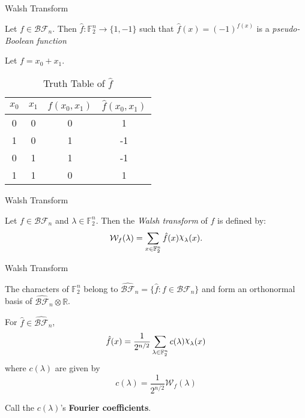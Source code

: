 \documentclass{beamer}
\def\gftwo{\mathbb{F}_2}
\def\BF{\mathcal{BF}}
\def\Chi{\raisebox{2pt}{$\chi$}}
\begin{document}
\begin{frame}{Walsh Transform}
  \begin{definition}\label{def:pBF}
    Let $f\in\BF_n$. Then $\hat{f}:\gftwo^n\rightarrow\{1,-1\}$ such that
    $\hat{f}(x)=(-1)^{f(x)}$ is a \textit{pseudo-Boolean function}
  \end{definition}
  \begin{example}
    Let $f=x_0+x_1$.
    \begin{table}
    \label{tab:truth-table}
    	\centering
      \begin{tabular}{|c|c||c|c|}
        \hline
        $x_0$&$x_1$&$f(x_0,x_1)$&$\hat{f}(x_0,x_1)$\\
        \hline
        0&0&0&1\\
        1&0&1&-1\\
        0&1&1&-1\\
        1&1&0&1\\
      	\hline
    	\end{tabular}
      \caption{Truth Table of $\hat{f}$}
    \end{table}
  \end{example}
\end{frame}

\begin{frame}{Walsh Transform}
  \begin{definition}\label{def:walsh}
    Let $f\in\BF_n$ and $\lambda\in\gftwo^n$. Then the {\em Walsh transform}
    of $f$ is defined by:
    \begin{equation}\label{eqn:walsh}
      \mathcal{W}_f(\lambda)=\sum_{x\in\gftwo^n}\hat{f}(x)\Chi_\lambda(x).
    \end{equation}
  \end{definition}
\end{frame}

\begin{frame}{Walsh Transform}
  \begin{lemma}
    The characters of $\gftwo^n$ belong to $\hat{\BF}_n
    =\{\hat{f}:f\in\BF_n\}$ and form an orthonormal basis of
    $\hat{\BF}_n\otimes\mathbb{R}$.
  \end{lemma}
  \begin{lemma}
    For $\hat{f}\in\hat{\BF}_n$,
  \begin{equation}\label{eqn:rewrite-pseudo}
  	\hat{f}(x)
      =\frac{1}{2^{n/2}}
        \sum_{\lambda\in\gftwo^n}c(\lambda)\Chi_\lambda(x)
  \end{equation}
  	where $c(\lambda)$ are given by
    \begin{equation}\label{eqn:clambda}
      c(\lambda)=\frac{1}{2^{n/2}}\mathcal{W}_f(\lambda)
    \end{equation}
  \end{lemma}
  Call the $c(\lambda)$'s {\bf Fourier coefficients}.
\end{frame}
\end{document}
